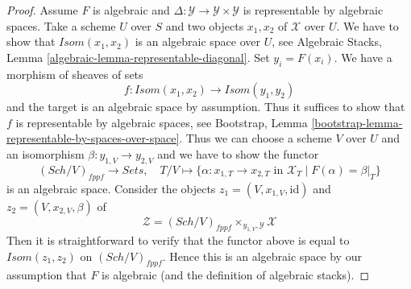 \documentclass{stacks-project}
\theoremstyle{plain}
\theoremstyle{definition}
\theoremstyle{remark}
\numberwithin{equation}{subsection}
\def\Sch{\mathit{Sch}}
\begin{document}
\begin{proof}
Assume $F$ is algebraic and
$\Delta : \mathcal{Y} \to \mathcal{Y} \times \mathcal{Y}$
is representable by algebraic spaces.
Take a scheme $U$ over $S$ and two objects $x_1, x_2$ of
$\mathcal{X}$ over $U$.
We have to show that $\mathit{Isom}(x_1, x_2)$ is an algebraic space
over $U$, see
Algebraic Stacks, Lemma \ref{algebraic-lemma-representable-diagonal}.
Set $y_i = F(x_i)$. We have a morphism of sheaves of sets
$$
f : \mathit{Isom}(x_1, x_2) \to \mathit{Isom}(y_1, y_2)
$$
and the target is an algebraic space by assumption.
Thus it suffices to show that $f$ is representable by
algebraic spaces, see Bootstrap, Lemma
\ref{bootstrap-lemma-representable-by-spaces-over-space}.
Thus we can choose a scheme $V$ over $U$ and an
isomorphism $\beta : y_{1, V} \to y_{2, V}$ and
we have to show the functor
$$
(\Sch/V)_{fppf} \to \textit{Sets},\quad
T/V \mapsto \{\alpha : x_{1, T} \to x_{2, T}
\text{ in }\mathcal{X}_T \mid F(\alpha) = \beta|_T\}
$$
is an algebraic space. Consider the objects
$z_1 = (V, x_{1, V}, \text{id})$ and 
$z_2 = (V, x_{2, V}, \beta)$ of
$$
\mathcal{Z} = (\Sch/V)_{fppf} \times_{y_{1, V}, \mathcal{Y}} \mathcal{X}
$$
Then it is straightforward to verify that
the functor above is equal to $\mathit{Isom}(z_1, z_2)$
on $(\Sch/V)_{fppf}$. Hence this is an algebraic space
by our assumption that $F$ is algebraic (and the definition
of algebraic stacks).
\end{proof}
\end{document}
